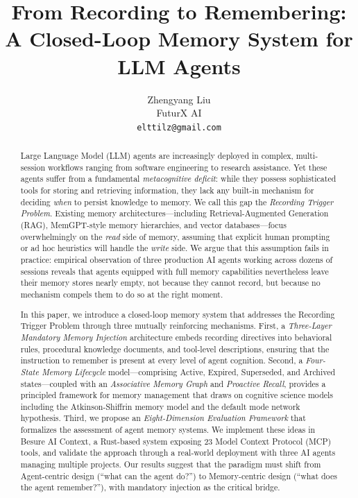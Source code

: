 \documentclass[11pt]{article}
\title{From Recording to Remembering: A Closed-Loop Memory System for LLM Agents}
\author{Zhengyang Liu\\
FuturX AI\\
\texttt{elttilz@gmail.com}}
\date{}
\begin{document}
\maketitle

\begin{abstract}
Large Language Model (LLM) agents are increasingly deployed in complex, multi-session workflows ranging from software engineering to research assistance. Yet these agents suffer from a fundamental \emph{metacognitive deficit}: while they possess sophisticated tools for storing and retrieving information, they lack any built-in mechanism for deciding \emph{when} to persist knowledge to memory. We call this gap the \emph{Recording Trigger Problem}. Existing memory architectures---including Retrieval-Augmented Generation (RAG), MemGPT-style memory hierarchies, and vector databases---focus overwhelmingly on the \emph{read} side of memory, assuming that explicit human prompting or ad hoc heuristics will handle the \emph{write} side. We argue that this assumption fails in practice: empirical observation of three production AI agents working across dozens of sessions reveals that agents equipped with full memory capabilities nevertheless leave their memory stores nearly empty, not because they cannot record, but because no mechanism compels them to do so at the right moment.

In this paper, we introduce a closed-loop memory system that addresses the Recording Trigger Problem through three mutually reinforcing mechanisms. First, a \emph{Three-Layer Mandatory Memory Injection} architecture embeds recording directives into behavioral rules, procedural knowledge documents, and tool-level descriptions, ensuring that the instruction to remember is present at every level of agent cognition. Second, a \emph{Four-State Memory Lifecycle} model---comprising Active, Expired, Superseded, and Archived states---coupled with an \emph{Associative Memory Graph} and \emph{Proactive Recall}, provides a principled framework for memory management that draws on cognitive science models including the Atkinson-Shiffrin memory model and the default mode network hypothesis. Third, we propose an \emph{Eight-Dimension Evaluation Framework} that formalizes the assessment of agent memory systems. We implement these ideas in Besure AI Context, a Rust-based system exposing 23 Model Context Protocol (MCP) tools, and validate the approach through a real-world deployment with three AI agents managing multiple projects. Our results suggest that the paradigm must shift from Agent-centric design (``what can the agent do?'') to Memory-centric design (``what does the agent remember?''), with mandatory injection as the critical bridge.
\end{abstract}
\end{document}
